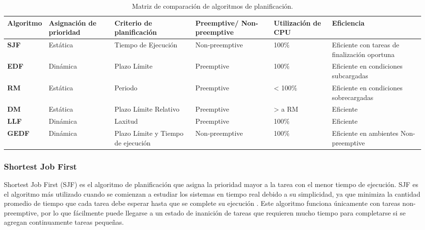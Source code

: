         \begin{table}[h!]
      \begin{center}
            \scriptsize
        \begin{tabular}{|m{1.5cm}|m{2cm}|m{2cm}|m{2cm}|m{2cm}|m{3cm}|}
         \hline
        \cellcolor{lightgray}\textbf{Algoritmo} & \cellcolor{lightgray} \textbf{Asignación de prioridad} & \cellcolor{lightgray} \textbf{Criterio de planificación} & \cellcolor{lightgray} \textbf{Preemptive/ Non-preemptive} & \cellcolor{lightgray} \textbf{Utilización de CPU} & \cellcolor{lightgray} \textbf{Eficiencia}  \\ 
         \hline
          \textbf{SJF} & Estática & Tiempo de Ejecución & Non-preemptive & 100\% & Eficiente con tareas de finalización oportuna \\
         \hline
         \textbf{EDF} & Dinámica & Plazo Límite & Preemptive & 100\% & Eficiente en condiciones subcargadas \\
         \hline 
         \textbf{RM} & Estática & Periodo & Preemptive & < 100\% & Eficiente en condiciones sobrecargadas \\
         \hline
          \textbf{DM} & Estática & Plazo Límite Relativo & Preemptive & > a RM & Eficiente \\
         \hline
          \textbf{LLF} & Dinámica & Laxitud & Preemptive & 100\% & Eficiente \\
         \hline
          \textbf{GEDF} & Dinámica & Plazo Límite y Tiempo de ejecución & Non-preemptive & 100\%& Eficiente en ambientes Non-preemptive \\
         \hline
                \end{tabular}
        \caption{Matriz de comparación de algoritmos de planificación.}
        \label{tab:algoTR}
      \end{center}
    \end{table}
    
    \subsubsection{Shortest Job First}
    Shortest Job First (SJF) es el algoritmo de planificación que asigna la prioridad mayor a la tarea con el menor tiempo de ejecución. SJF es el algoritmo más utilizado cuando se comienzan a estudiar los sistemas en tiempo real debido a su simplicidad, ya que minimiza la cantidad promedio de tiempo que cada tarea debe esperar hasta que se complete su ejecución \cite{Tanenbaum}. Este algoritmo funciona únicamente con tareas non-preemptive, por lo que fácilmente puede llegarse a un estado de inanición de tareas que requieren mucho tiempo para completarse si se agregan continuamente tareas pequeñas.
    
